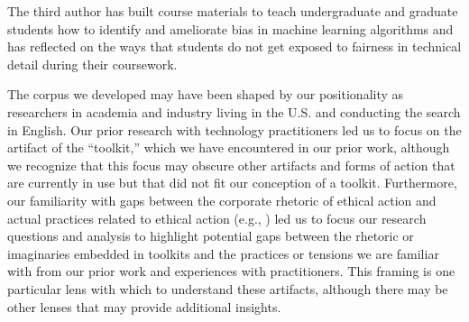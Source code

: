 \documentclass[acmsmall]{acmart}
\begin{document}
The third author %
has built course materials to teach undergraduate and graduate students how to identify and ameliorate bias in machine learning algorithms and has reflected on the %
ways that students do not get exposed to fairness in technical detail during their coursework. %

The corpus we developed may have been shaped by our positionality as researchers in academia and industry living in the U.S. and conducting the search in English. Our prior research with technology practitioners led us to focus on the artifact of the ``toolkit,'' which we have encountered in our prior work, although we recognize that this focus may obscure other artifacts and forms of action that are currently in use but that did not fit our conception of a toolkit. Furthermore, our familiarity with gaps between the corporate rhetoric of ethical action and actual practices related to ethical action (e.g., \cite{Hoffmann2020terms}) led us to focus our research questions and analysis to highlight potential gaps between the rhetoric or imaginaries embedded in toolkits and the practices or tensions we are familiar with from our prior work and experiences with practitioners. This framing is one particular lens with which to understand these artifacts, although there may be other lenses that may provide additional insights.
\end{document}
